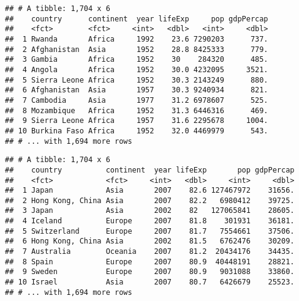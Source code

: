 \documentclass[
]{article}
\newenvironment{Shaded}{\begin{snugshade}}{\end{snugshade}}
\newcommand{\CommentTok}[1]{\textcolor[rgb]{0.56,0.35,0.01}{\textit{#1}}}
\newcommand{\DecValTok}[1]{\textcolor[rgb]{0.00,0.00,0.81}{#1}}
\newcommand{\KeywordTok}[1]{\textcolor[rgb]{0.13,0.29,0.53}{\textbf{#1}}}
\newcommand{\NormalTok}[1]{#1}
\newcommand{\OperatorTok}[1]{\textcolor[rgb]{0.81,0.36,0.00}{\textbf{#1}}}
\newcommand{\StringTok}[1]{\textcolor[rgb]{0.31,0.60,0.02}{#1}}
\begin{document}
\begin{verbatim}
## # A tibble: 1,704 x 6
##    country      continent  year lifeExp     pop gdpPercap
##    <fct>        <fct>     <int>   <dbl>   <int>     <dbl>
##  1 Rwanda       Africa     1992    23.6 7290203      737.
##  2 Afghanistan  Asia       1952    28.8 8425333      779.
##  3 Gambia       Africa     1952    30    284320      485.
##  4 Angola       Africa     1952    30.0 4232095     3521.
##  5 Sierra Leone Africa     1952    30.3 2143249      880.
##  6 Afghanistan  Asia       1957    30.3 9240934      821.
##  7 Cambodia     Asia       1977    31.2 6978607      525.
##  8 Mozambique   Africa     1952    31.3 6446316      469.
##  9 Sierra Leone Africa     1957    31.6 2295678     1004.
## 10 Burkina Faso Africa     1952    32.0 4469979      543.
## # ... with 1,694 more rows
\end{verbatim}

\begin{Shaded}
\end{Shaded}

\begin{verbatim}
## # A tibble: 1,704 x 6
##    country          continent  year lifeExp       pop gdpPercap
##    <fct>            <fct>     <int>   <dbl>     <int>     <dbl>
##  1 Japan            Asia       2007    82.6 127467972    31656.
##  2 Hong Kong, China Asia       2007    82.2   6980412    39725.
##  3 Japan            Asia       2002    82   127065841    28605.
##  4 Iceland          Europe     2007    81.8    301931    36181.
##  5 Switzerland      Europe     2007    81.7   7554661    37506.
##  6 Hong Kong, China Asia       2002    81.5   6762476    30209.
##  7 Australia        Oceania    2007    81.2  20434176    34435.
##  8 Spain            Europe     2007    80.9  40448191    28821.
##  9 Sweden           Europe     2007    80.9   9031088    33860.
## 10 Israel           Asia       2007    80.7   6426679    25523.
## # ... with 1,694 more rows
\end{verbatim}

\begin{Shaded}
\end{Shaded}
\end{document}
